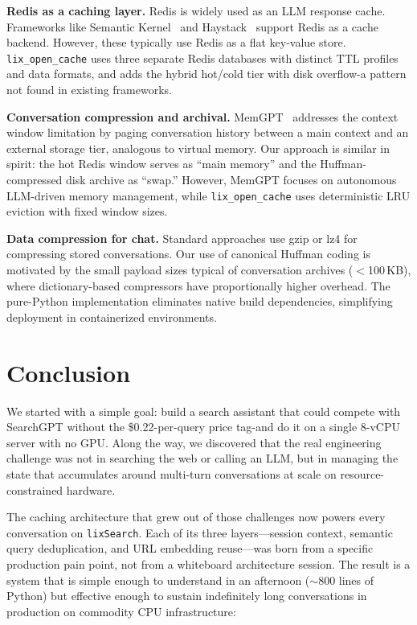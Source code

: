 \documentclass[conference]{IEEEtran}
\begin{document}
\textbf{Redis as a caching layer.}
Redis is widely used as an LLM response cache. Frameworks like Semantic Kernel~\cite{semantic_kernel2023} and Haystack~\cite{haystack2023} support Redis as a cache backend. However, these typically use Redis as a flat key-value store. \texttt{lix\_open\_cache} uses three separate Redis databases with distinct TTL profiles and data formats, and adds the hybrid hot/cold tier with disk overflow-a pattern not found in existing frameworks.

\textbf{Conversation compression and archival.}
MemGPT~\cite{memgpt2023} addresses the context window limitation by paging conversation history between a main context and an external storage tier, analogous to virtual memory. Our approach is similar in spirit: the hot Redis window serves as ``main memory'' and the Huffman-compressed disk archive as ``swap.'' However, MemGPT focuses on autonomous LLM-driven memory management, while \texttt{lix\_open\_cache} uses deterministic LRU eviction with fixed window sizes.

\textbf{Data compression for chat.}
Standard approaches use gzip or lz4 for compressing stored conversations. Our use of canonical Huffman coding is motivated by the small payload sizes typical of conversation archives ($<$100\,KB), where dictionary-based compressors have proportionally higher overhead. The pure-Python implementation eliminates native build dependencies, simplifying deployment in containerized environments.

\section{Conclusion}
\label{sec:conclusion}

We started with a simple goal: build a search assistant that could compete with SearchGPT without the \$0.22-per-query price tag-and do it on a single 8-vCPU server with no GPU. Along the way, we discovered that the real engineering challenge was not in searching the web or calling an LLM, but in managing the state that accumulates around multi-turn conversations at scale on resource-constrained hardware.

The caching architecture that grew out of those challenges now powers every conversation on \texttt{lixSearch}. Each of its three layers---session context, semantic query deduplication, and URL embedding reuse---was born from a specific production pain point, not from a whiteboard architecture session. The result is a system that is simple enough to understand in an afternoon (${\sim}800$ lines of Python) but effective enough to sustain indefinitely long conversations in production on commodity CPU infrastructure:
\end{document}
